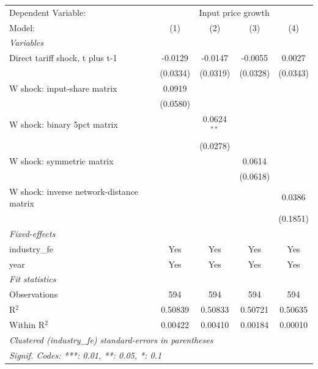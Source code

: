 \begingroup
\centering
\begin{tabular}{lcccc}
   \tabularnewline \midrule \midrule
   Dependent Variable: & \multicolumn{4}{c}{Input price growth}\\
   Model:                                   & (1)      & (2)           & (3)      & (4)\\  
   \midrule
   \emph{Variables}\\
   Direct tariff shock, t plus t-1          & -0.0129  & -0.0147       & -0.0055  & 0.0027\\   
                                            & (0.0334) & (0.0319)      & (0.0328) & (0.0343)\\   
   W shock: input-share matrix              & 0.0919   &               &          &   \\   
                                            & (0.0580) &               &          &   \\   
   W shock: binary 5pct matrix              &          & 0.0624$^{**}$ &          &   \\   
                                            &          & (0.0278)      &          &   \\   
   W shock: symmetric matrix                &          &               & 0.0614   &   \\   
                                            &          &               & (0.0618) &   \\   
   W shock: inverse network-distance matrix &          &               &          & 0.0386\\   
                                            &          &               &          & (0.1851)\\   
   \midrule
   \emph{Fixed-effects}\\
   industry\_fe                             & Yes      & Yes           & Yes      & Yes\\  
   year                                     & Yes      & Yes           & Yes      & Yes\\  
   \midrule
   \emph{Fit statistics}\\
   Observations                             & 594      & 594           & 594      & 594\\  
   R$^2$                                    & 0.50839  & 0.50833       & 0.50721  & 0.50635\\  
   Within R$^2$                             & 0.00422  & 0.00410       & 0.00184  & 0.00010\\  
   \midrule \midrule
   \multicolumn{5}{l}{\emph{Clustered (industry\_fe) standard-errors in parentheses}}\\
   \multicolumn{5}{l}{\emph{Signif. Codes: ***: 0.01, **: 0.05, *: 0.1}}\\
\end{tabular}
\par\endgroup
